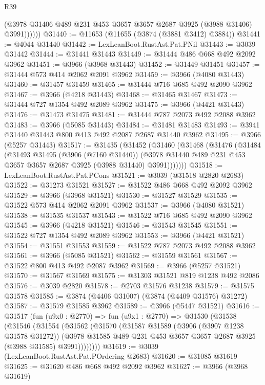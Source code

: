 \begin{lexlean}{R39}
\begin{coremodule}
              (@3978 @31406 @489 @231 @453 @3657 @3657 @2687 @3925 (@3988 @31406) @3991))))))
@31440 := @11653 (@11655 (@3874 (@3881 @3412) @3884))
@31441 := @4044 @31440
@31442 := LexLeanBoot.RustAst.Pat.PNil
@31443 := @3039 @31442
@31444 := @31441 @31443
@31449 := @31444 @486 @668 @492 @2092 @3962
@31451 := @3966 (@3968 @31443)
@31452 := @31449 @31451
@31457 := @31444 @573 @414 @2062 @2091 @3962
@31459 := @3966 (@4080 @31443)
@31460 := @31457 @31459
@31465 := @31444 @716 @685 @492 @2090 @3962
@31467 := @3966 (@4218 @31443)
@31468 := @31465 @31467
@31473 := @31444 @727 @1354 @492 @2089 @3962
@31475 := @3966 (@4421 @31443)
@31476 := @31473 @31475
@31481 := @31444 @787 @2073 @492 @2088 @3962
@31483 := @3966 (@5085 @31443)
@31484 := @31481 @31483
@31493 := @3941 @31440 @31443 @800 @413 @492 @2087 @2687 @31440 @3962
@31495 := @3966 (@5257 @31443)
@31517 := @31435
    (@31452
      (@31460
        (@31468
          (@31476
            (@31484
              (@31493
                @31495
                (@3906 (@7160 @31440))
                (@3978 @31440 @489 @231 @453 @3657 @3657 @2687 @3925 (@3988 @31440) @3991)))))))
@31518 := LexLeanBoot.RustAst.Pat.PCons
@31521 := @3039 (@31518 @2820 @2683)
@31522 := @31273 @31521
@31527 := @31522 @486 @668 @492 @2092 @3962
@31529 := @3966 (@3968 @31521)
@31530 := @31527 @31529
@31535 := @31522 @573 @414 @2062 @2091 @3962
@31537 := @3966 (@4080 @31521)
@31538 := @31535 @31537
@31543 := @31522 @716 @685 @492 @2090 @3962
@31545 := @3966 (@4218 @31521)
@31546 := @31543 @31545
@31551 := @31522 @727 @1354 @492 @2089 @3962
@31553 := @3966 (@4421 @31521)
@31554 := @31551 @31553
@31559 := @31522 @787 @2073 @492 @2088 @3962
@31561 := @3966 (@5085 @31521)
@31562 := @31559 @31561
@31567 := @31522 @800 @413 @492 @2087 @3962
@31569 := @3966 (@5257 @31521)
@31570 := @31567 @31569
@31575 := @31303 @31521 @819 @1238 @492 @2086
@31576 := @3039 @2820
@31578 := @2703 @31576 @31238
@31579 := @31575 @31578
@31585 := @3874 (@4406 @31007) (@3874 (@4409 @31576) @31272)
@31587 := @31579 @31585 @3962
@31589 := @3966 (@5447 @31521)
@31616 := @31517
    (fun (u9x0 : @2770) =>
    fun (u9x1 : @2770) =>
    @31530
      (@31538
        (@31546
          (@31554
            (@31562
              (@31570
                (@31587
                  @31589
                  (@3906 (@3907 @1238 @31578 @31272))
                  (@3978 @31585 @489 @231 @453 @3657 @3657 @2687 @3925 (@3988 @31585) @3991))))))))
@31619 := @3039 (LexLeanBoot.RustAst.Pat.POrdering @2683)
@31620 := @31085 @31619
@31625 := @31620 @486 @668 @492 @2092 @3962
@31627 := @3966 (@3968 @31619)

\end{coremodule}
\end{lexlean}
